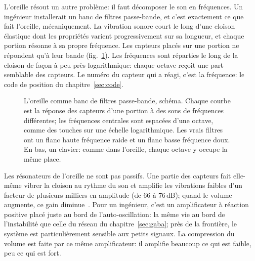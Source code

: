 L'oreille résout un autre problème: il faut décomposer le son en fréquences. Un ingénieur installerait un banc de filtres passe-bande, et c'est exactement ce que fait l'oreille, mécaniquement. La vibration sonore court le long d'une cloison élastique dont les propriétés varient progressivement sur sa longueur, et chaque portion résonne à sa propre fréquence. Les capteurs placés sur une portion ne répondent qu'à leur bande (fig.~\ref{fig:filterbank}). Les fréquences sont réparties le long de la cloison de façon à peu près logarithmique: chaque octave reçoit une part semblable des capteurs. Le numéro du capteur qui a réagi, c'est la fréquence: le code de position du chapitre~\ref{sec:code}.

\begin{figure}[t]
\centering
\ifLuaTeX\else{}\fi%
\ifLuaTeX\else{}\fi
\caption{L'oreille comme banc de filtres passe-bande, schéma. Chaque courbe est la réponse des capteurs d'une portion à des sons de fréquences différentes; les fréquences centrales sont espacées d'une octave, comme des touches sur une échelle logarithmique. Les vrais filtres ont un flanc haute fréquence raide et un flanc basse fréquence doux. En bas, un clavier: comme dans l'oreille, chaque octave y occupe la même place.}
\label{fig:filterbank}
\end{figure}

Les résonateurs de l'oreille ne sont pas passifs. Une partie des capteurs fait elle-même vibrer la cloison au rythme du son et amplifie les vibrations faibles d'un facteur de plusieurs milliers en amplitude (de $66$ à $76$\,dB); quand le volume augmente, ce gain diminue~\cite{Ruggero1997,Robles2001}. Pour un ingénieur, c'est un amplificateur à réaction positive placé juste au bord de l'auto-oscillation: la même vie au bord de l'instabilité que celle du réseau du chapitre~\ref{sec:gaba}; près de la frontière, le système est particulièrement sensible aux petits signaux. La compression du volume est faite par ce même amplificateur: il amplifie beaucoup ce qui est faible, peu ce qui est fort.

